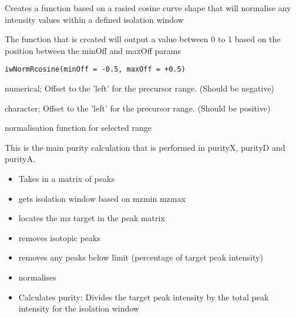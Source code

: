 \documentclass[letterpaper]{book}
\begin{document}
%
\begin{Description}\relax
Creates a function based on a rasied cosine curve shape that will normalise any intensity values within
a defined isolation window

The function that is created will output a value between 0 to 1 based on the position between
the minOff and maxOff params
\end{Description}
%
\begin{Usage}
\begin{verbatim}
iwNormRcosine(minOff = -0.5, maxOff = +0.5)
\end{verbatim}
\end{Usage}
%
\begin{Arguments}
\begin{ldescription}
\item[\code{minOff}] numerical; Offset to the 'left' for the precursor range. (Should be negative)

\item[\code{maxOff}] character; Offset to the 'left' for the precursor range. (Should be positive)
\end{ldescription}
\end{Arguments}
%
\begin{Value}
normalisation function for selected range
\end{Value}
%
\begin{Examples}
\end{Examples}
%
\begin{Description}\relax
This is the main purity calculation that is performed in purityX,
purityD and purityA.
\begin{itemize}

\item Takes in a matrix of peaks
\item gets isolation window based on mzmin mzmax
\item locates the mz target in the peak matrix
\item removes isotopic peaks
\item removes any peaks below limit (percentage of target peak intensity)
\item normalises
\item Calculates purity: Divides the target peak intensity by the total peak intensity for
the isolation window

\end{itemize}

\end{Description}
\end{document}
